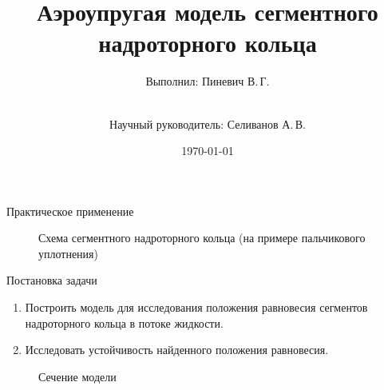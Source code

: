 \documentclass[ignoreonframetext,unicode]{beamer}
\title[Аэроупргугая модель]{Аэроупругая модель сегментного надроторного кольца}
\author[Пиневич В.\,Г.]{Выполнил: Пиневич В.\,Г.\and\\[0.5mm] Научный руководитель: Селиванов А.\,В.}
\institute[каф. Прикладная математика ФН-2]{группа ФН2-81Б}
\date{\today}
\begin{document}
	
	\begin{frame}[plain]
		\maketitle
	\end{frame}


	\begin{frame}{Практическое применение}
		\vspace*{-10mm}
		\begin{figure}[!htbp]
			\caption{Схема сегментного надроторного кольца (на примере пальчикового уплотнения)}
			\label{vved-2}
		\end{figure}
	\end{frame}

	\begin{frame}{Постановка задачи}
		\vspace*{2mm}
	\begin{enumerate}	
	\item Построить модель для исследования положения равновесия сегментов надроторного кольца в потоке жидкости.
	\item Исследовать устойчивость найденного положения равновесия.
\end{enumerate}
		
		\vspace*{-4mm}
	\begin{figure}[!htbp]
		\caption{Сечение модели}
		\label{pruzina}
	\end{figure}	
		
	
		
	\end{frame}
\end{document}
